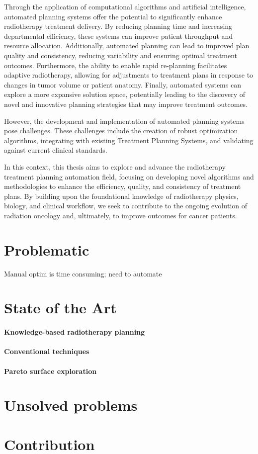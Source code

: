 Through the application of computational algorithms and artificial intelligence, automated planning systems offer the potential to significantly enhance radiotherapy treatment delivery.
By reducing planning time and increasing departmental efficiency, these systems can improve patient throughput and resource allocation.
Additionally, automated planning can lead to improved plan quality and consistency, reducing variability and ensuring optimal treatment outcomes.
Furthermore, the ability to enable rapid re-planning facilitates adaptive radiotherapy, allowing for adjustments to treatment plans in response to changes in tumor volume or patient anatomy.
Finally, automated systems can explore a more expansive solution space, potentially leading to the discovery of novel and innovative planning strategies that may improve treatment outcomes.

However, the development and implementation of automated planning systems pose challenges.
These challenges include the creation of robust optimization algorithms, integrating with existing Treatment Planning Systems, and validating against current clinical standards.

In this context, this thesis aims to explore and advance the radiotherapy treatment planning automation field, focusing on developing novel algorithms and methodologies to enhance the efficiency, quality, and consistency of treatment plans.
By building upon the foundational knowledge of radiotherapy physics, biology, and clinical workflow, we seek to contribute to the ongoing evolution of radiation oncology and, ultimately, to improve outcomes for cancer patients.

\section{Problematic}
Manual optim is time consuming; need to automate

\section{State of the Art}
\paragraph{Knowledge-based radiotherapy planning}

\paragraph{Conventional techniques}

\paragraph{Pareto surface exploration}

\section{Unsolved problems}

\section{Contribution}
